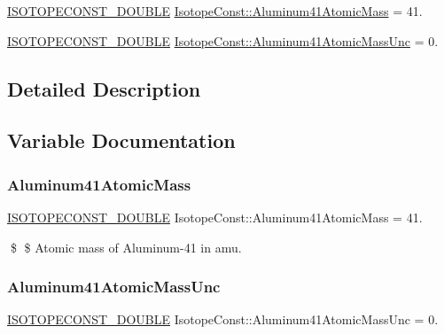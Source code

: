\begin{DoxyCompactItemize}
\item 
\mbox{\hyperlink{group___isotope_const-_macros_ga8f45a7272ce02c0b4c65c44636ed719a}{I\+S\+O\+T\+O\+P\+E\+C\+O\+N\+S\+T\+\_\+\+D\+O\+U\+B\+LE}} \mbox{\hyperlink{group___isotope_const-_aluminum-_al41_gab5dba9eb70baec6eab0fd3e0ea7db219}{Isotope\+Const\+::\+Aluminum41\+Atomic\+Mass}} = 41.
\item 
\mbox{\hyperlink{group___isotope_const-_macros_ga8f45a7272ce02c0b4c65c44636ed719a}{I\+S\+O\+T\+O\+P\+E\+C\+O\+N\+S\+T\+\_\+\+D\+O\+U\+B\+LE}} \mbox{\hyperlink{group___isotope_const-_aluminum-_al41_gaa23413257f08203078fa1bcb386b90fe}{Isotope\+Const\+::\+Aluminum41\+Atomic\+Mass\+Unc}} = 0.
\end{DoxyCompactItemize}


\subsection{Detailed Description}


\subsection{Variable Documentation}
\mbox{\label{group___isotope_const-_aluminum-_al41_gab5dba9eb70baec6eab0fd3e0ea7db219}} 
\subsubsection{\texorpdfstring{Aluminum41\+Atomic\+Mass}{Aluminum41AtomicMass}}
{\footnotesize\ttfamily \mbox{\hyperlink{group___isotope_const-_macros_ga8f45a7272ce02c0b4c65c44636ed719a}{I\+S\+O\+T\+O\+P\+E\+C\+O\+N\+S\+T\+\_\+\+D\+O\+U\+B\+LE}} Isotope\+Const\+::\+Aluminum41\+Atomic\+Mass = 41.}

\$ \$ Atomic mass of Aluminum-\/41 in amu. \mbox{\label{group___isotope_const-_aluminum-_al41_gaa23413257f08203078fa1bcb386b90fe}} 
\subsubsection{\texorpdfstring{Aluminum41\+Atomic\+Mass\+Unc}{Aluminum41AtomicMassUnc}}
{\footnotesize\ttfamily \mbox{\hyperlink{group___isotope_const-_macros_ga8f45a7272ce02c0b4c65c44636ed719a}{I\+S\+O\+T\+O\+P\+E\+C\+O\+N\+S\+T\+\_\+\+D\+O\+U\+B\+LE}} Isotope\+Const\+::\+Aluminum41\+Atomic\+Mass\+Unc = 0.}

